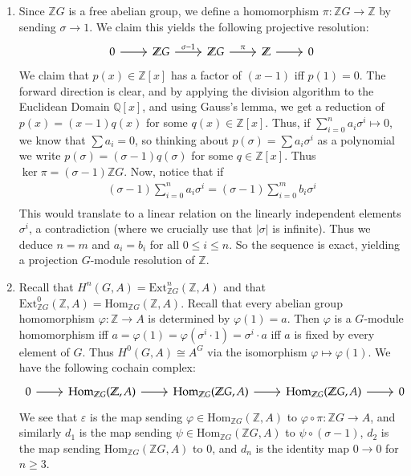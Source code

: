 \documentclass[12pt]{article}
\theoremstyle{definitionstyle}
\def\mbb#1{\mathbb{#1}}
\def\cph{\varphi}
\def\ve{\varepsilon}
\newcommand{\Z}{\mbb Z}
\newcommand{\Q}{\mbb Q}
\newcommand{\Hom}{\mathrm{Hom}}
\newcommand{\Ext}{\mathrm{Ext}}
\begin{document}
    \begin{enumerate}[label=(\alph*)]
        \item Since $\Z G$ is a free abelian group, we define a homomorphism $\pi: \Z G \to \Z$ by sending $\sigma \to 1$. We claim this yields the following projective resolution:
        \[\begin{tikzcd}
            0 & {\Z G} & {\Z G} & \Z & 0
            \arrow[from=1-1, to=1-2]
            \arrow["{\sigma-1}", from=1-2, to=1-3]
            \arrow["\pi", from=1-3, to=1-4]
            \arrow[from=1-4, to=1-5]
        \end{tikzcd}\]
        We claim that $p(x) \in \Z[x]$ has a factor of $(x-1)$ iff $p(1) = 0$. The forward direction is clear, and by applying the division algorithm to the Euclidean Domain $\Q[x]$, and using Gauss's lemma, we get a reduction of $p(x) = (x-1)q(x)$ for some $q(x) \in \Z[x]$. Thus, if $\sum_{i=0}^n a_i \sigma^i \mapsto 0$, we know that $\sum a_i = 0$, so thinking about $p(\sigma) = \sum a_i\sigma^i$ as a polynomial we write $p(\sigma) = (\sigma-1)q(\sigma)$ for some $q \in \Z[x]$. Thus $\ker \pi = (\sigma-1)\Z G$. Now, notice that if 
        \begin{align*}
            (\sigma-1)\sum_{i=0}^n a_i\sigma^i = (\sigma-1)\sum_{i=0}^m b_i\sigma^i \\
        \end{align*}
        This would translate to a linear relation on the linearly independent elements $\sigma^i$, a contradiction (where we crucially use that $|\sigma|$ is infinite). Thus we deduce $n=m$ and $a_i = b_i$ for all $0 \leq i \leq n$. So the sequence is exact, yielding a projection $G$-module resolution of $\Z$.

        \item Recall that $H^n(G, A) = \Ext^n_{\Z G}(\Z, A)$ and that $\Ext^0_{\Z G}(\Z, A) = \Hom_{\Z G}(\Z, A)$. Recall that every abelian group homomorphism $\cph: \Z \to A$ is determined by $\cph(1) = a$. Then $\cph$ is a $G$-module homomorphism iff $a = \cph(1) = \cph(\sigma^i \cdot 1) = \sigma^i \cdot a$ iff $a$ is fixed by every element of $G$. Thus $H^0(G, A) \cong A^G$ via the isomorphism $\cph \mapsto \cph(1)$. We have the following cochain complex:
        \[\begin{tikzcd}
            0 & {\Hom_{\Z G}(\Z, A)} & {\Hom_{\Z G}(\Z G, A)} & {\Hom_{\Z G}(\Z G, A)} & 0
            \arrow[from=1-1, to=1-2]
            \arrow[from=1-2, to=1-3]
            \arrow[from=1-3, to=1-4]
            \arrow[from=1-4, to=1-5]
        \end{tikzcd}\]
        We see that $\ve$ is the map sending $\cph \in \Hom_{\Z G}(\Z, A)$ to $\cph \circ \pi: \Z G \to A$, and similarly $d_1$ is the map sending $\psi \in \Hom_{\Z G}(\Z G, A)$ to $\psi \circ (\sigma-1)$, $d_2$ is the map sending $\Hom_{\Z G}(\Z G, A)$ to $0$, and $d_n$ is the identity map $0 \to 0$ for $n \geq 3$.


\end{enumerate}
\end{document}
